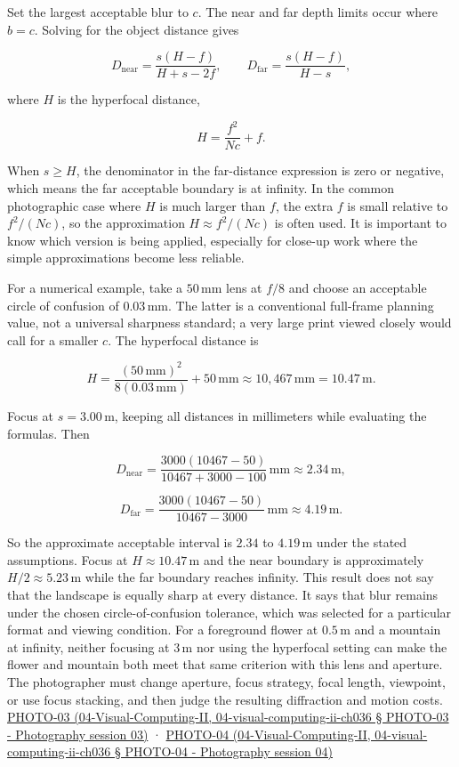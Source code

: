Set the largest acceptable blur to \(c\). The near and far depth limits occur where \(b=c\). Solving for the object distance gives

\[
D_{\mathrm{near}}=\frac{s(H-f)}{H+s-2f},\qquad
D_{\mathrm{far}}=\frac{s(H-f)}{H-s},
\]

where \(H\) is the hyperfocal distance,

\[
H=\frac{f^2}{Nc}+f.
\]

When \(s\ge H\), the denominator in the far-distance expression is zero or negative, which means the far acceptable boundary is at infinity. In the common photographic case where \(H\) is much larger than \(f\), the extra \(f\) is small relative to \(f^2/(Nc)\), so the approximation \(H\approx f^2/(Nc)\) is often used. It is important to know which version is being applied, especially for close-up work where the simple approximations become less reliable.

For a numerical example, take a \(50\,\mathrm{mm}\) lens at \(f/8\) and choose an acceptable circle of confusion of \(0.03\,\mathrm{mm}\). The latter is a conventional full-frame planning value, not a universal sharpness standard; a very large print viewed closely would call for a smaller \(c\). The hyperfocal distance is

\[
H=\frac{(50\,\mathrm{mm})^2}{8(0.03\,\mathrm{mm})}+50\,\mathrm{mm}\approx10{,}467\,\mathrm{mm}=10.47\,\mathrm{m}.
\]

Focus at \(s=3.00\,\mathrm{m}\), keeping all distances in millimeters while evaluating the formulas. Then

\[
D_{\mathrm{near}}=\frac{3000(10467-50)}{10467+3000-100}\,\mathrm{mm}\approx2.34\,\mathrm{m},
\]

\[
D_{\mathrm{far}}=\frac{3000(10467-50)}{10467-3000}\,\mathrm{mm}\approx4.19\,\mathrm{m}.
\]

So the approximate acceptable interval is \(2.34\) to \(4.19\,\mathrm{m}\) under the stated assumptions. Focus at \(H\approx10.47\,\mathrm{m}\) and the near boundary is approximately \(H/2\approx5.23\,\mathrm{m}\) while the far boundary reaches infinity. This result does not say that the landscape is equally sharp at every distance. It says that blur remains under the chosen circle-of-confusion tolerance, which was selected for a particular format and viewing condition. For a foreground flower at \(0.5\,\mathrm{m}\) and a mountain at infinity, neither focusing at \(3\,\mathrm{m}\) nor using the hyperfocal setting can make the flower and mountain both meet that same criterion with this lens and aperture. The photographer must change aperture, focus strategy, focal length, viewpoint, or use focus stacking, and then judge the resulting diffraction and motion costs. \href{}{PHOTO-03 (04-Visual-Computing-II, 04-visual-computing-ii-ch036 § PHOTO-03 - Photography session 03)} · \href{}{PHOTO-04 (04-Visual-Computing-II, 04-visual-computing-ii-ch036 § PHOTO-04 - Photography session 04)}

